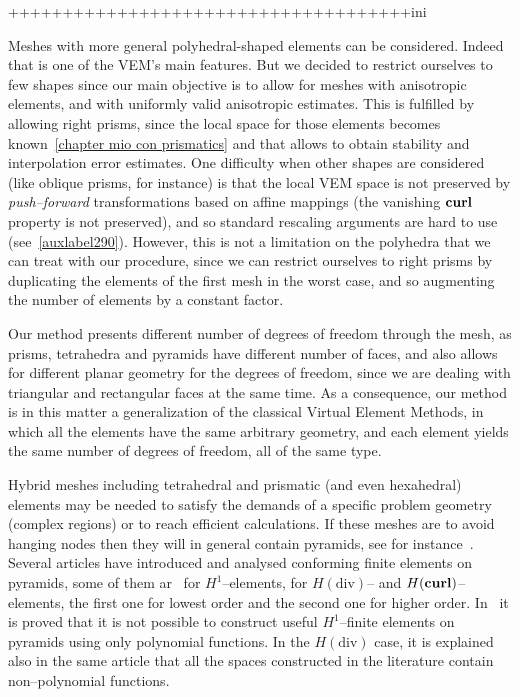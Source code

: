 +++++++++++++++++++++++++++++++++++++ini



Meshes with more general polyhedral-shaped elements can be considered. 
Indeed that is one of the VEM's main features. But we decided to restrict
ourselves to few 
shapes since our main objective is to allow for meshes with anisotropic elements, 
and with uniformly valid anisotropic 
estimates. This is fulfilled by allowing right prisms, since the local space for
those elements becomes known~\ref{chapter mio con prismatics} 
and that allows to obtain stability and interpolation error estimates. One 
difficulty when other shapes are considered (like
oblique prisms, for instance) is that the local VEM space is not preserved by 
\emph{push--forward} transformations based on affine mappings
(the vanishing ${\bf curl}$ 
property is not preserved), and so standard rescaling arguments are hard to use 
(see~\ref{auxlabel290}). However, this is not a limitation on the polyhedra
that we can treat with our procedure, since we can restrict ourselves
to right prisms by duplicating the elements of the first mesh in the worst case,
and so augmenting the number of elements by a constant factor.

Our method presents different number of degrees of freedom through the 
mesh, as prisms, tetrahedra and pyramids have different number of faces, and also 
allows for different planar geometry for the degrees of freedom, since we are dealing
with triangular and rectangular faces at the same time. As a consequence, our 
method is in this matter a generalization of the classical Virtual Element Methods,
in which all the elements have the same arbitrary geometry, and each element yields
the same number of degrees of freedom, all of the same type.

Hybrid meshes including tetrahedral and prismatic (and even hexahedral) 
elements may be needed to satisfy the demands of a specific problem geometry 
(complex regions) or to reach efficient calculations. If these meshes are 
to avoid hanging nodes then they will in general contain pyramids, see 
for instance~\cite{owenSaigal}. Several articles have introduced and analysed 
conforming finite elements on pyramids, some of them ar~\cite{bergot} 
for $H^1$--elements, 
\cite{gh99, Nigam-2012} for $H(\mbox{div})$-- and $H({\bf curl})$--elements, 
the first one for 
lowest order and the second one for higher order. 
In~\cite{Nigam-2012} it is proved that it is not possible to construct 
useful $H^1$--finite 
elements on pyramids using only polynomial functions. In the $H(\mbox{div})$ 
case, it is explained also in the same article that all the spaces 
constructed in the literature contain non--polynomial functions.

